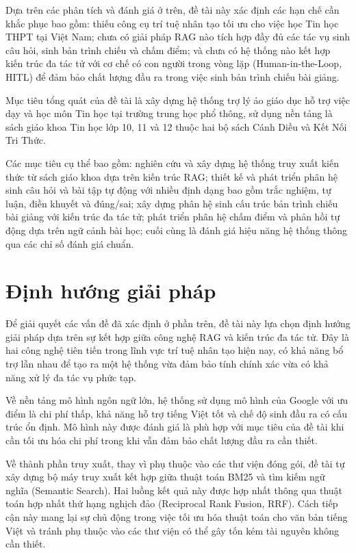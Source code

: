 \documentclass[../DoAn.tex]{subfiles}
\begin{document}
Dựa trên các phân tích và đánh giá ở trên, đề tài này xác định các hạn chế cần khắc phục bao gồm: thiếu công cụ trí tuệ nhân tạo tối ưu cho việc học Tin học THPT tại Việt Nam; chưa có giải pháp RAG nào tích hợp đầy đủ các tác vụ sinh câu hỏi, sinh bản trình chiếu và chấm điểm; và chưa có hệ thống nào kết hợp kiến trúc đa tác tử với cơ chế có con người trong vòng lặp (Human-in-the-Loop, HITL) để đảm bảo chất lượng đầu ra trong việc sinh bản trình chiếu bài giảng.

Mục tiêu tổng quát của đề tài là xây dựng hệ thống trợ lý ảo giáo dục hỗ trợ việc dạy và học môn Tin học tại trường trung học phổ thông, sử dụng nền tảng là sách giáo khoa Tin học lớp 10, 11 và 12 thuộc hai bộ sách Cánh Diều và Kết Nối Tri Thức.

Các mục tiêu cụ thể bao gồm: nghiên cứu và xây dựng hệ thống truy xuất kiến thức từ sách giáo khoa dựa trên kiến trúc RAG; thiết kế và phát triển phân hệ sinh câu hỏi và bài tập tự động với nhiều định dạng bao gồm trắc nghiệm, tự luận, điền khuyết và đúng/sai; xây dựng phân hệ sinh cấu trúc bản trình chiếu bài giảng với kiến trúc đa tác tử; phát triển phân hệ chấm điểm và phản hồi tự động dựa trên ngữ cảnh bài học; cuối cùng là đánh giá hiệu năng hệ thống thông qua các chỉ số đánh giá chuẩn.

\section{Định hướng giải pháp}
\label{section:1.3}

Để giải quyết các vấn đề đã xác định ở phần trên, đề tài này lựa chọn định hướng giải pháp dựa trên sự kết hợp giữa công nghệ RAG và kiến trúc đa tác tử. Đây là hai công nghệ tiên tiến trong lĩnh vực trí tuệ nhân tạo hiện nay, có khả năng bổ trợ lẫn nhau để tạo ra một hệ thống vừa đảm bảo tính chính xác vừa có khả năng xử lý đa tác vụ phức tạp.

Về nền tảng mô hình ngôn ngữ lớn, hệ thống sử dụng mô hình của Google với ưu điểm là chi phí thấp, khả năng hỗ trợ tiếng Việt tốt và chế độ sinh đầu ra có cấu trúc ổn định. Mô hình này được đánh giá là phù hợp với mục tiêu của đề tài khi cần tối ưu hóa chi phí trong khi vẫn đảm bảo chất lượng đầu ra cần thiết.

Về thành phần truy xuất, thay vì phụ thuộc vào các thư viện đóng gói, đề tài tự xây dựng bộ máy truy xuất kết hợp giữa thuật toán BM25 và tìm kiếm ngữ nghĩa (Semantic Search). Hai luồng kết quả này được hợp nhất thông qua thuật toán hợp nhất thứ hạng nghịch đảo (Reciprocal Rank Fusion, RRF). Cách tiếp cận này mang lại sự chủ động trong việc tối ưu hóa thuật toán cho văn bản tiếng Việt và tránh phụ thuộc vào các thư viện có thể gây tốn kém tài nguyên không cần thiết.
\end{document}
